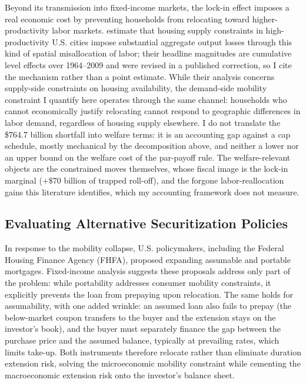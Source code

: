 \documentclass[12pt]{article}
\begin{document}
Beyond its transmission into fixed-income markets, the lock-in effect imposes a real economic cost by preventing households from relocating toward higher-productivity labor markets. \citet{hsieh2019} estimate that housing supply constraints in high-productivity U.S. cities impose substantial aggregate output losses through this kind of spatial misallocation of labor; their headline magnitudes are cumulative level effects over 1964--2009 and were revised in a published correction, so I cite the mechanism rather than a point estimate. While their analysis concerns supply-side constraints on housing availability, the demand-side mobility constraint I quantify here operates through the same channel: households who cannot economically justify relocating cannot respond to geographic differences in labor demand, regardless of housing supply elsewhere. I do not translate the \$764.7 billion shortfall into welfare terms: it is an accounting gap against a cap schedule, mostly mechanical by the decomposition above, and neither a lower nor an upper bound on the welfare cost of the par-payoff rule. The welfare-relevant objects are the constrained moves themselves, whose fiscal image is the lock-in marginal ($+\$70$ billion of trapped roll-off), and the forgone labor-reallocation gains this literature identifies, which my accounting framework does not measure.

\subsection{Evaluating Alternative Securitization Policies}\label{sec:discussion-policy}

In response to the mobility collapse, U.S. policymakers, including the Federal Housing Finance Agency (FHFA), proposed expanding assumable and portable mortgages. Fixed-income analysis suggests these proposals address only part of the problem: while portability addresses consumer mobility constraints, it explicitly prevents the loan from prepaying upon relocation. The same holds for assumability, with one added wrinkle: an assumed loan also fails to prepay (the below-market coupon transfers to the buyer and the extension stays on the investor's book), and the buyer must separately finance the gap between the purchase price and the assumed balance, typically at prevailing rates, which limits take-up. Both instruments therefore relocate rather than eliminate duration extension risk, solving the microeconomic mobility constraint while cementing the macroeconomic extension risk onto the investor's balance sheet.
\end{document}
